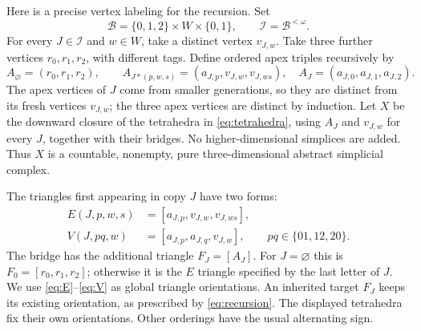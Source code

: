 \documentclass[11pt]{article}
\begin{document}
Here is a precise vertex labeling for the recursion. Set
\[
 \mathcal B=\{0,1,2\}\times W\times\{0,1\},
 \qquad \mathcal I=\mathcal B^{<\omega}.
\]
For every $J\in\mathcal I$ and $w\in W$, take a distinct vertex $v_{J,w}$.
Take three further vertices $r_0,r_1,r_2$, with different tags. Define ordered
apex triples recursively by
\begin{equation}\label{eq:recursion}
 A_{\varnothing}=(r_0,r_1,r_2),\qquad
 A_{J*(p,w,s)}=(a_{J,p},v_{J,w},v_{J,ws}),
 \quad A_J=(a_{J,0},a_{J,1},a_{J,2}).
\end{equation}
The apex vertices of $J$ come from smaller generations, so they are distinct
from its fresh vertices $v_{J,w}$; the three apex vertices are distinct by
induction. Let $X$ be the downward closure of the tetrahedra in
\eqref{eq:tetrahedra}, using $A_J$ and $v_{J,w}$ for every $J$, together with
their bridges. No higher-dimensional simplices are added. Thus $X$ is a
countable, nonempty, pure three-dimensional abstract simplicial complex.

The triangles first appearing in copy $J$ have two forms:
\begin{align}
 E(J,p,w,s)&=[a_{J,p},v_{J,w},v_{J,ws}],\label{eq:E}\\
 V(J,pq,w)&=[a_{J,p},a_{J,q},v_{J,w}],
       \qquad pq\in\{01,12,20\}.\label{eq:V}
\end{align}
The bridge has the additional triangle $F_J=[A_J]$. For $J=\varnothing$ this
is $F_0=[r_0,r_1,r_2]$; otherwise it is the $E$ triangle specified by the last
letter of $J$. We use \eqref{eq:E}--\eqref{eq:V} as global triangle
orientations. An inherited target $F_J$ keeps its existing orientation, as
prescribed by \eqref{eq:recursion}. The displayed tetrahedra fix their own
orientations. Other orderings have the usual alternating sign.
\end{document}
